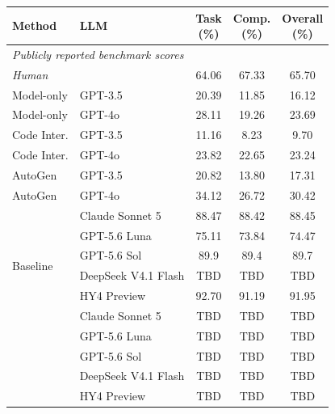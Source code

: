 \documentclass{article}
\newcommand{\method}{\textsc{CARE}}
\newcommand{\na}{\textemdash}
\newcommand{\headpct}{(\%)}
\newcommand{\tabpubliclyreported}[1]{%
  \multicolumn{#1}{l}{\textit{Publicly reported benchmark scores}}\\%
}
\begin{document}
\begin{table}[t]
  \begin{minipage}[t]{0.48\textwidth}
    \centering
    \label{tab:dsbench-matrix}
    \scriptsize
    \setlength{\tabcolsep}{2.5pt}
    \begin{tabular}{llccc}
      \toprule
      Method & LLM & \makecell{Task\\\headpct} & \makecell{Comp.\\\headpct} & \makecell{Overall\\\headpct} \\
      \midrule
      \tabpubliclyreported{5}
      \textit{Human} & \na & 64.06 & 67.33 & 65.70 \\
      Model-only & GPT-3.5 & 20.39 & 11.85 & 16.12 \\
      Model-only & GPT-4o & 28.11 & 19.26 & 23.69 \\
      Code Inter. & GPT-3.5 & 11.16 & 8.23 & 9.70 \\
      Code Inter. & GPT-4o & 23.82 & 22.65 & 23.24 \\
      AutoGen & GPT-3.5 & 20.82 & 13.80 & 17.31 \\
      AutoGen & GPT-4o & 34.12 & 26.72 & 30.42 \\
      \midrule
      \multirow{6}{*}{Baseline}
        & Claude Sonnet 5 & 88.47 & 88.42 & 88.45 \\
        & GPT-5.6 Luna & 75.11 & 73.84 & 74.47 \\
        & GPT-5.6 Sol & 89.9 & 89.4 & 89.7 \\
        & DeepSeek V4.1 Flash & TBD & TBD & TBD \\
        & HY4 Preview & 92.70 & 91.19 & 91.95 \\
      \midrule
      \multirow{6}{*}{\method{}}
        & Claude Sonnet 5 & TBD & TBD & TBD \\
        & GPT-5.6 Luna & TBD & TBD & TBD \\
        & GPT-5.6 Sol & TBD & TBD & TBD \\
        & DeepSeek V4.1 Flash & TBD & TBD & TBD \\
        & HY4 Preview & TBD & TBD & TBD \\
      \bottomrule
    \end{tabular}
  \end{minipage}
\end{table}
\end{document}
